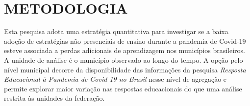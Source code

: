 \documentclass[
	12pt,				%
	openright,			%
	oneside,			%
	a4paper,			%
	brazil,				%
	]{article}
\begin{document}
\newpage
\section{METODOLOGIA} \label{sec:metodologia}





Esta pesquisa adota uma estratégia quantitativa para investigar se a baixa
adoção de estratégias não presenciais de ensino durante a pandemia de Covid-19
esteve associada a perdas adicionais de aprendizagem nos municípios brasileiros.
A unidade de análise é o município observado ao longo do tempo. A opção pelo
nível municipal decorre da disponibilidade das informações da pesquisa
\textit{Resposta Educacional à Pandemia de Covid-19 no Brasil} nesse nível de
agregação e permite explorar maior variação nas respostas educacionais do que
uma análise restrita às unidades da federação.
\end{document}
